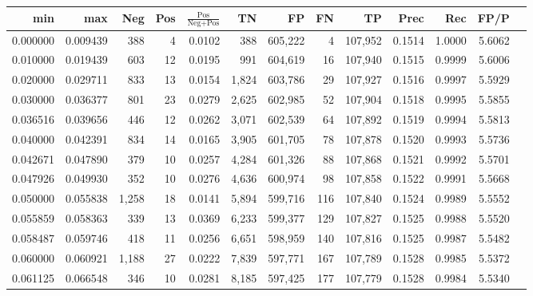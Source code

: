 \begin{tabular}{rrrrrrrrrrrrr}
\toprule
     min &      max &   Neg & Pos & $\frac{\text{Pos}}{\text{Neg}+\text{Pos}}$ &      TN &      FP &      FN &      TP &   Prec &    Rec &   FP/P \\
\midrule
0.000000 & 0.009439 &   388 &   4 &                                     0.0102 &     388 & 605,222 &       4 & 107,952 & 0.1514 & 1.0000 & 5.6062 \\
0.010000 & 0.019439 &   603 &  12 &                                     0.0195 &     991 & 604,619 &      16 & 107,940 & 0.1515 & 0.9999 & 5.6006 \\
0.020000 & 0.029711 &   833 &  13 &                                     0.0154 &   1,824 & 603,786 &      29 & 107,927 & 0.1516 & 0.9997 & 5.5929 \\
0.030000 & 0.036377 &   801 &  23 &                                     0.0279 &   2,625 & 602,985 &      52 & 107,904 & 0.1518 & 0.9995 & 5.5855 \\
0.036516 & 0.039656 &   446 &  12 &                                     0.0262 &   3,071 & 602,539 &      64 & 107,892 & 0.1519 & 0.9994 & 5.5813 \\
0.040000 & 0.042391 &   834 &  14 &                                     0.0165 &   3,905 & 601,705 &      78 & 107,878 & 0.1520 & 0.9993 & 5.5736 \\
0.042671 & 0.047890 &   379 &  10 &                                     0.0257 &   4,284 & 601,326 &      88 & 107,868 & 0.1521 & 0.9992 & 5.5701 \\
0.047926 & 0.049930 &   352 &  10 &                                     0.0276 &   4,636 & 600,974 &      98 & 107,858 & 0.1522 & 0.9991 & 5.5668 \\
0.050000 & 0.055838 & 1,258 &  18 &                                     0.0141 &   5,894 & 599,716 &     116 & 107,840 & 0.1524 & 0.9989 & 5.5552 \\
0.055859 & 0.058363 &   339 &  13 &                                     0.0369 &   6,233 & 599,377 &     129 & 107,827 & 0.1525 & 0.9988 & 5.5520 \\
0.058487 & 0.059746 &   418 &  11 &                                     0.0256 &   6,651 & 598,959 &     140 & 107,816 & 0.1525 & 0.9987 & 5.5482 \\
0.060000 & 0.060921 & 1,188 &  27 &                                     0.0222 &   7,839 & 597,771 &     167 & 107,789 & 0.1528 & 0.9985 & 5.5372 \\
0.061125 & 0.066548 &   346 &  10 &                                     0.0281 &   8,185 & 597,425 &     177 & 107,779 & 0.1528 & 0.9984 & 5.5340 \\

\end{tabular}
